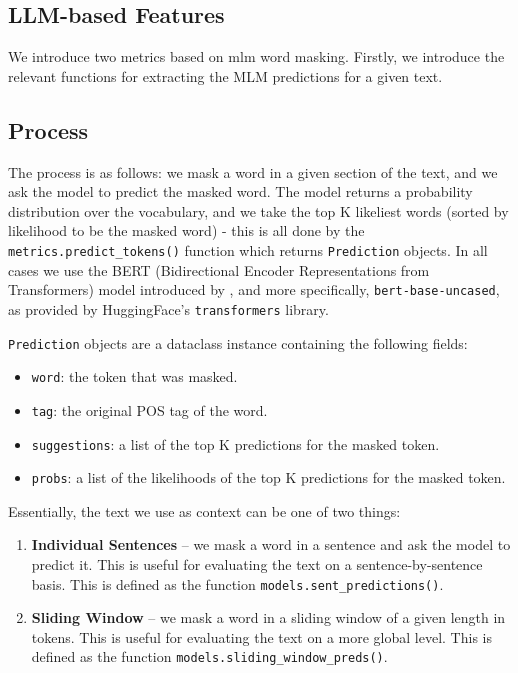 \subsection{LLM-based Features}
We introduce two metrics based on \acrfull{mlm} word masking. Firstly, we introduce the relevant functions for extracting the MLM predictions for a given text.

\subsection*{Process}

The process is as follows: we mask a word in a given section of the text, and we ask the model to predict the masked word. The model returns a probability distribution over the vocabulary, and we take the top K likeliest words (sorted by likelihood to be the masked word) - this is all done by the \texttt{metrics.predict\_tokens()} function which returns \texttt{Prediction} objects. In all cases we use the BERT (Bidirectional Encoder Representations from Transformers) model introduced by \cite*{devlin2019bert}, and more specifically, \texttt{bert-base-uncased}, as provided by HuggingFace's \texttt{transformers} library. 
    
    \texttt{Prediction} objects are a dataclass instance containing the following fields:
    \begin{itemize}
        \item \texttt{word}: the token that was masked.
        \item \texttt{tag}: the original POS tag of the word.
        \item \texttt{suggestions}: a list of the top K predictions for the masked token.
        \item \texttt{probs}: a list of the likelihoods of the top K predictions for the masked token.
    \end{itemize}

    Essentially, the text we use as context can be one of two things: 

    \begin{enumerate}
        \item \textbf{Individual Sentences} -- we mask a word in a sentence and ask the model to predict it. This is useful for evaluating the text on a sentence-by-sentence basis. This is defined as the function \texttt{models.sent\_predictions()}.
        \item \textbf{Sliding Window} -- we mask a word in a sliding window of a given length in tokens. This is useful for evaluating the text on a more global level. This is defined as the function \texttt{models.sliding\_window\_preds()}.
    \end{enumerate}
    

